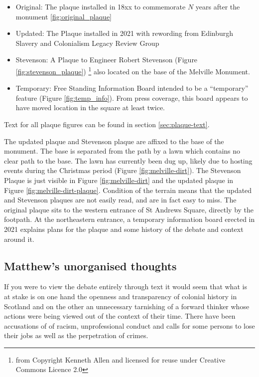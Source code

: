 \documentclass{scrartcl}
\begin{document}
\begin{itemize}
    \item Original: The plaque installed in 18xx to commemorate $N$ years after the monument \ref{fig:original_plaque}
    \item Updated: The Plaque installed in 2021 with rewording from Edinburgh Slavery and Colonialism Legacy Review Group
    \item Stevenson: A Plaque to Engineer Robert Stevenson (Figure \ref{fig:stevenson_plaque}) \footnote{from Copyright Kenneth Allen and licensed for reuse under Creative Commons Licence 2.0} also located on the base of the Melville Monument.
    \item Temporary: Free Standing Information Board intended to be a ``temporary'' feature (Figure \ref{fig:temp_info}). From press coverage, this board appears to have moved location in the square at least twice.
\end{itemize}

Text for all plaque figures can be found in section \ref{sec:plaque-text}.

The updated plaque and Stevenson plaque are affixed to the base of the monument. The base is separated from the path by a lawn which contains no clear path to the base. The lawn has currently been dug up, likely due to hosting events during the Christmas period (Figure \ref{fig:melville-dirt}). The Stevenson Plaque is just visible in Figure \ref{fig:melville-dirt} and the updated plaque in Figure \ref{fig:melville-dirt-plaque}. Condition of the terrain means that the updated and Stevenson plaques are not easily read, and are in fact easy to miss. The original plaque sits to the western entrance of St Andrews Square, directly by the footpath. At the northeastern entrance, a temporary information board erected in 2021 explains plans for the plaque and some history of the debate and context around it.

\subsection{Matthew's unorganised thoughts}

If you were to view the debate entirely through text it would seem that what is at stake is on one hand the openness and transparency of colonial history in Scotland and on the other an unnecessary tarnishing of a forward thinker whose actions were being viewed out of the context of their time. There have been accusations of of racism, unprofessional conduct and calls for some persons to lose their jobs as well as the perpetration of crimes.
\end{document}
